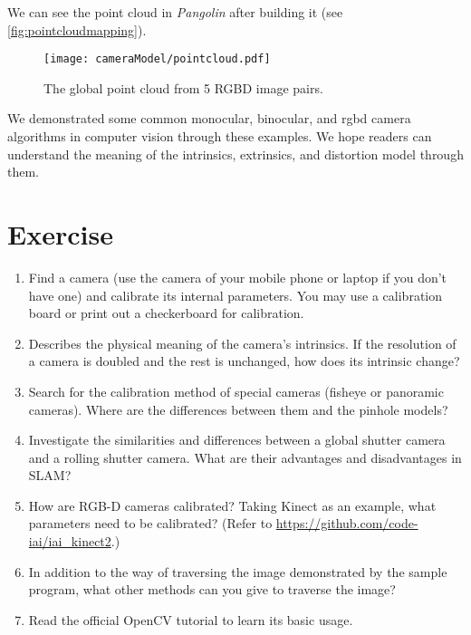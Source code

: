 We can see the point cloud in \textit{Pangolin} after building it (see \autoref{fig:pointcloudmapping}).

\begin{figure}[!t]
    \centering
    \texttt{[image: cameraModel/pointcloud.pdf]}
    \caption{The global point cloud from 5 RGBD image pairs.}
    \label{fig:pointcloudmapping}
\end{figure}

We demonstrated some common monocular, binocular, and rgbd camera algorithms in computer vision through these examples. We hope readers can understand the meaning of the intrinsics, extrinsics, and distortion model through them.

\section * {Exercise}
\begin{enumerate}
\item[\optional] Find a camera (use the camera of your mobile phone or laptop if you don't have one) and calibrate its internal parameters. You may use a calibration board or print out a checkerboard for calibration.
\item Describes the physical meaning of the camera's intrinsics. If the resolution of a camera is doubled and the rest is unchanged, how does its intrinsic change?
\item Search for the calibration method of special cameras (fisheye or panoramic cameras). Where are the differences between them and the pinhole models? 
\item Investigate the similarities and differences between a global shutter camera and a rolling shutter camera. What are their advantages and disadvantages in SLAM?
\item How are RGB-D cameras calibrated? Taking Kinect as an example, what parameters need to be calibrated? (Refer to \url{https://github.com/code-iai/iai_kinect2}.)
\item In addition to the way of traversing the image demonstrated by the sample program, what other methods can you give to traverse the image?
\item[\optional] Read the official OpenCV tutorial to learn its basic usage.
\end{enumerate}

